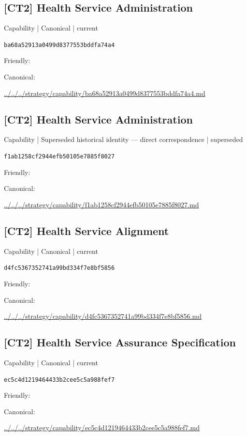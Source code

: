 \documentclass[10pt,a4paper]{article}
\begin{document}
\subsection*{[CT2] Health Service Administration}
{\small Capability | Canonical | current}\par
\texttt{ba68a52913a0499d8377553bddfa74a4}\par
Friendly: \par
Canonical: \par
{\footnotesize\url{../../../strategy/capability/ba68a52913a0499d8377553bddfa74a4.md}}\par
\subsection*{[CT2] Health Service Administration}
{\small Capability | Superseded historical identity — direct correspondence | superseded}\par
\texttt{f1ab1258cf2944efb50105e7885f8027}\par
Friendly: \par
Canonical: \par
{\footnotesize\url{../../../strategy/capability/f1ab1258cf2944efb50105e7885f8027.md}}\par
\subsection*{[CT2] Health Service Alignment}
{\small Capability | Canonical | current}\par
\texttt{d4fc5367352741a99bd334f7e8bf5856}\par
Friendly: \par
Canonical: \par
{\footnotesize\url{../../../strategy/capability/d4fc5367352741a99bd334f7e8bf5856.md}}\par
\subsection*{[CT2] Health Service Assurance Specification}
{\small Capability | Canonical | current}\par
\texttt{ec5c4d1219464433b2cee5c5a988fef7}\par
Friendly: \par
Canonical: \par
{\footnotesize\url{../../../strategy/capability/ec5c4d1219464433b2cee5c5a988fef7.md}}\par
\end{document}
